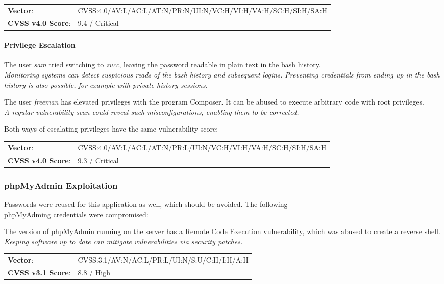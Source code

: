 \documentclass[../report.tex]{subfiles}
\begin{document}
\begin{tabular}{l l}
\textbf{Vector}: & CVSS:4.0/AV:L/AC:L/AT:N/PR:N/UI:N/VC:H/VI:H/VA:H/SC:H/SI:H/SA:H\\
\textbf{CVSS v4.0 Score}: & 9.4 / Critical\\
\end{tabular}

\paragraph{Privilege Escalation}
The user \textit{sam} tried switching to \textit{zucc}, leaving the password readable in plain text in the bash history.\\
\textit{Monitoring systems can detect suspicious reads of the bash history and subsequent logins. Preventing credentials from ending up in the bash history is also possible, for example with private history sessions.}

The user \textit{freeman} has elevated privileges with the program Composer. It can be abused to execute arbitrary code with root privileges.\\
\textit{A regular vulnerability scan could reveal such misconfigurations, enabling them to be corrected.}

Both ways of escalating privileges have the same vulnerability score:

\begin{tabular}{l l}
\textbf{Vector}: & CVSS:4.0/AV:L/AC:L/AT:N/PR:L/UI:N/VC:H/VI:H/VA:H/SC:H/SI:H/SA:H\\
\textbf{CVSS v4.0 Score}: & 9.3 / Critical\\
\end{tabular}

\subsubsection{phpMyAdmin Exploitation}
Passwords were reused for this application as well, which should be avoided.
The following\\ phpMyAdming credentials were compromised:

The version of phpMyAdmin running on the server has a Remote Code Execution vulnerability, which was abused to create a reverse shell.\\
\textit{Keeping software up to date can mitigate vulnerabilities via security patches.}

\begin{tabular}{l l}
\textbf{Vector}: & CVSS:3.1/AV:N/AC:L/PR:L/UI:N/S:U/C:H/I:H/A:H\\
\textbf{CVSS v3.1 Score}: & 8.8 / High\\
\end{tabular}
\end{document}
